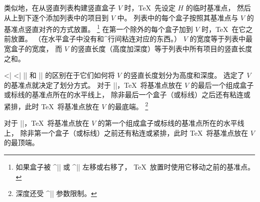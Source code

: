 类似地，在从竖直列表构建竖直盒子 $V$ 时，\TeX\ 先设定 $H$ 的临时基准点，
然后从上到下逐个添加列表中的项目到 $V$ 中。
列表中的每个盒子按照其基准点与 $V$ 的基准点竖直对齐的方式放置。%
\footnote{如果盒子被 ^|\moveleft| 或 ^|\moveright| 左移或右移了，
\TeX\ 放置时使用它移动之前的基准点。}
在第一个除外的每个盒子加到 $V$ 时，\TeX\ 在它之前放置。%
（在水平盒子中没有和^{行间粘连}对应的东西。）%
$V$ 的宽度等于列表中最宽盒子的宽度，
而 $V$ 的竖直长度（高度加深度）等于列表中所有项目的竖直长度之和。

\bix^^|\vbox|
\bix^^|\vtop|
|\vbox| 和 |\vtop| 的区别在于它们如何将 $V$ 的竖直长度划分为高度和深度。
选定了 $V$ 的基准点就决定了划分方式。
\ulist
\li 对于 |\vbox|，\TeX\ 将基准点放在 $V$ 的最后一个组成盒子或标线的基准点所在的水平线上，
除非最后一个盒子（或标线）之后还有粘连或紧排，此时 \TeX\ 将基准点放在 $V$ 的最底端。
\footnote{深度还受 ^|\boxmaxdepth| 参数\ctsref{\boxmaxdepth}限制。}

\li 对于 |\vtop|，\TeX\ 将基准点放在 $V$ 的第一个组成盒子或标线的基准点所在的水平线上，
除非第一个盒子（或标线）之前还有粘连或紧排，此时 \TeX\ 将基准点放在 $V$ 的最顶端。

